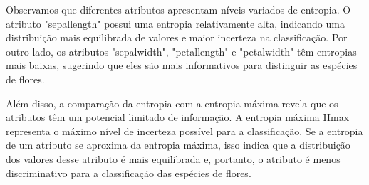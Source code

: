 \documentclass{article}
\begin{document}
Observamos que diferentes atributos apresentam níveis variados de entropia. O atributo "sepallength" possui uma entropia relativamente alta, indicando uma distribuição mais equilibrada de valores e maior incerteza na classificação. Por outro lado, os atributos "sepalwidth", "petallength" e "petalwidth" têm entropias mais baixas, sugerindo que eles são mais informativos para distinguir as espécies de flores.

Além disso, a comparação da entropia com a entropia máxima revela que os atributos têm um potencial limitado de informação. A entropia máxima Hmax representa o máximo nível de incerteza possível para a classificação. Se a entropia de um atributo se aproxima da entropia máxima, isso indica que a distribuição dos valores desse atributo é mais equilibrada e, portanto, o atributo é menos discriminativo para a classificação das espécies de flores.
\end{document}
